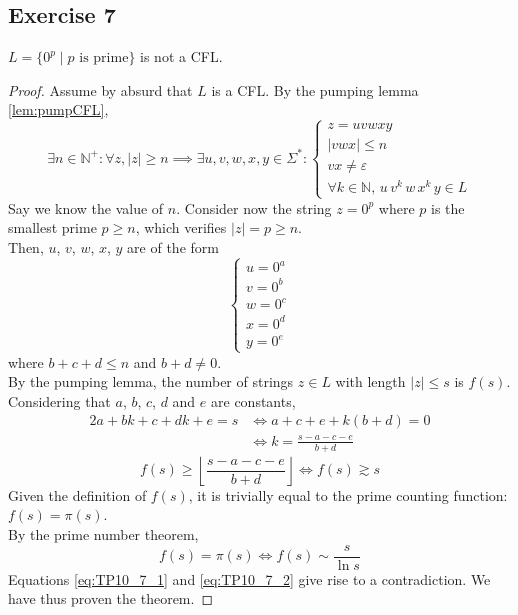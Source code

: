 \documentclass[docid=TP10]{tcom_TP}
\begin{document}
{\subsection{Exercise 7}
\begin{theorem}
	$L=\{0^p\mid p \text{ is prime}\}$ is not a CFL.
\end{theorem}
\begin{proof}
Assume by absurd that $L$ is a CFL. By the pumping lemma \eqref{lem:pumpCFL},
\begin{equation*}
	\exists n \in \mathbb{N}^+ \colon \forall z, |z|\geq n \implies \exists u, v, w, x, y \in \Sigma^* \colon 
	\begin{cases}
		z=uvwxy\\
		|vwx| \leq n\\
		vx \neq \varepsilon \\
		\forall k \in \mathbb{N},\,u\,v^k\,w\,x^k\,y \in L
	\end{cases}
\end{equation*}
Say we know the value of $n$. Consider now the string $z=0^p$ where $p$ is the smallest prime $p\geq n$, which verifies $|z|=p \geq n$.\\
Then, $u$, $v$, $w$, $x$, $y$ are of the form
\begin{equation*}
	\begin{cases}
		u=0^a\\
		v=0^b\\
		w=0^c\\
		x=0^d\\
		y=0^e
	\end{cases}
\end{equation*}
where $b+c+d \leq n$ and $b+d \neq 0$.\\
By the pumping lemma, the number of strings $z\in L$ with length $|z|\leq s$ is $f(s)$.
Considering that $a$, $b$, $c$, $d$ and $e$ are constants,
\begin{alignat*}{2}
	a+bk+c+dk+e=s
	&\iff a+c+e+k(b+d)=0\\
	&\iff k           =\frac{s-a-c-e}{b+d}
\end{alignat*}
\begin{equation} \label{eq:TP10_7_1}
	f(s) \geq \left\lfloor \frac{s-a-c-e}{b+d} \right\rfloor \iff f(s) \gtrsim s
\end{equation}
Given the definition of $f(s)$, it is trivially equal to the prime counting function: $f(s)=\pi(s)$.\\
By the prime number theorem,
\begin{equation} \label{eq:TP10_7_2}
	f(s) = \pi(s) \iff f(s) \sim \frac{s}{\ln{s}}
\end{equation}
Equations \eqref{eq:TP10_7_1} and \eqref{eq:TP10_7_2} give rise to a contradiction. We have thus proven the theorem.
\end{proof}
\pagebreak
}
\end{document}
